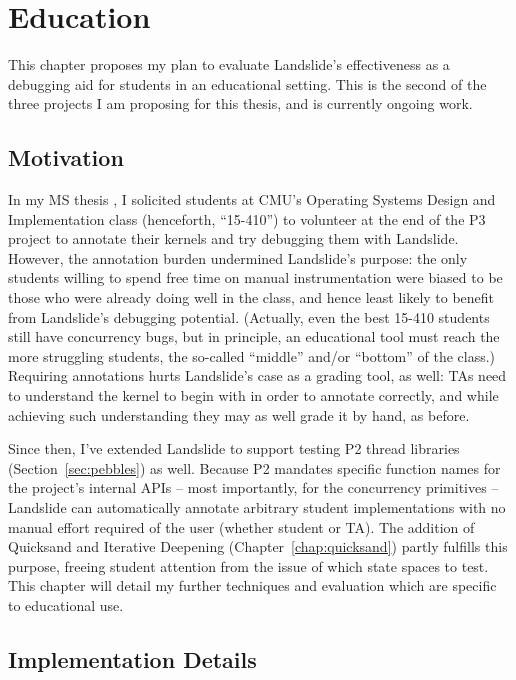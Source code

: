 \chapter{Education}
\label{chap:410}

This chapter proposes my plan to evaluate Landslide's effectiveness as a debugging aid for students in an educational setting.
This is the second of the three projects I am proposing for this thesis, and is currently ongoing work.

\section{Motivation}

In my MS thesis \cite{landslide}, I solicited students at CMU's Operating Systems Design and Implementation class
(henceforth, ``15-410'')
to volunteer at the end of the P3 project to annotate their kernels and try debugging them with Landslide.
However, the annotation burden undermined Landslide's purpose:
the only students willing to spend free time on manual instrumentation were biased to be those who were already doing well in the class,
and hence least likely to benefit from Landslide's debugging potential.
(Actually, even the best 15-410 students still have concurrency bugs,
but in principle, an educational tool must reach the more struggling students,
the so-called ``middle'' and/or ``bottom'' of the class.)
%
Requiring annotations hurts Landslide's case as a grading tool, as well:
TAs need to understand the kernel to begin with in order to annotate correctly,
and while achieving such understanding they may as well grade it by hand, as before.

Since then, I've extended Landslide to support testing P2 thread libraries (Section~\ref{sec:pebbles}) as well.
Because P2 mandates specific function names for the project's internal APIs
-- most importantly, for the concurrency primitives --
Landslide can automatically annotate arbitrary student implementations with no manual effort required of the user (whether student or TA).
The addition of Quicksand and Iterative Deepening (Chapter~\ref{chap:quicksand}) partly fulfills this purpose,
freeing student attention from the issue of which state spaces to test.
This chapter will detail my further techniques and evaluation which are specific to educational use.

\section{Implementation Details}

